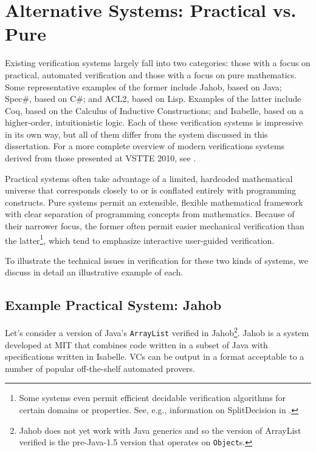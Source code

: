 \section{Alternative Systems: Practical vs. Pure}
Existing verification systems largely fall into two categories: those with a focus on practical, automated verification and those with a focus on pure mathematics.  Some representative examples of the former include Jahob\cite{kuncakJahobOverview}, based on Java; Spec\#\cite{specsharp}, based on C\#; and ACL2\cite{kaufmannACL2}, based on Lisp.  Examples of the latter include Coq\cite{coq}, based on the Calculus of Inductive Constructions; and Isabelle\cite{nipkowIsabelle}, based on a higher-order, intuitionistic logic.  Each of these verification systems is impressive in its own way, but all of them differ from the system discussed in this dissertation.  For a more complete overview of modern verifications systems derived from those presented at VSTTE 2010, see \cite{BronishVSTTE}.

Practical systems often take advantage of a limited, hardcoded mathematical universe that corresponds closely to or is conflated entirely with programming constructs.  Pure systems permit an extensible, flexible mathematical framework with clear separation of programming concepts from mathematics.  Because of their narrower focus, the former often permit easier mechanical verification than the latter\footnote{Some systems even permit efficient decidable verification algorithms for certain domains or properties.  See, e.g., information on SplitDecision in \cite{Sit11}.}, which tend to emphasize interactive user-guided verification.

To illustrate the technical issues in verification for these two kinds of systems, we discuss in detail an illustrative example of each.

\subsection{Example Practical System: Jahob\label{sec:exPractical}}
Let's consider a version of Java's \texttt{ArrayList} verified in Jahob\footnote{Jahob does not yet work with Java generics and so the version of ArrayList verified is the pre-Java-1.5 version that operates on \texttt{Object}s.}.  Jahob is a system developed at MIT that combines code written in a subset of Java with specifications written in Isabelle.  VCs can be output in a format acceptable to a number of popular off-the-shelf automated provers.

